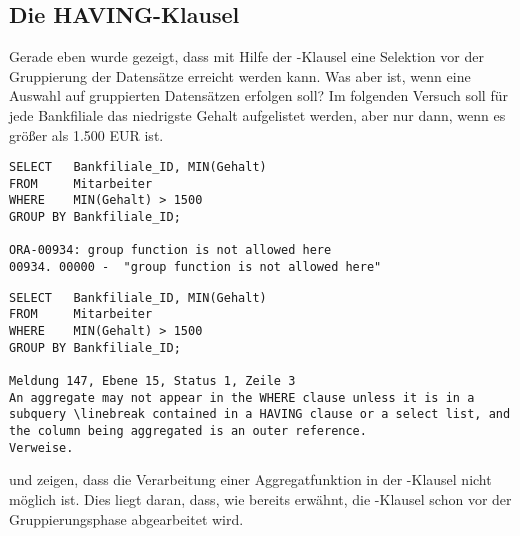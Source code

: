       \subsection{Die HAVING-Klausel}
        Gerade eben wurde gezeigt, dass mit Hilfe der \WHERE-Klausel eine Selektion vor der Gruppierung der Datensätze erreicht werden kann. Was aber ist, wenn eine Auswahl auf gruppierten Datensätzen erfolgen soll? Im folgenden Versuch soll für jede Bankfiliale das niedrigste Gehalt aufgelistet werden, aber nur dann, wenn es größer als 1.500 EUR ist.
        \begin{lstlisting}[language=oracle_sql,caption={Ein Versuch\dots mit Oracle},label=sql05_16]
SELECT   Bankfiliale_ID, MIN(Gehalt)
FROM     Mitarbeiter
WHERE    MIN(Gehalt) > 1500
GROUP BY Bankfiliale_ID;

ORA-00934: group function is not allowed here
00934. 00000 -  "group function is not allowed here"
        \end{lstlisting}
        \begin{lstlisting}[language=ms_sql,caption={Der gleiche Versuch\dots mit MS SQL Server},label=sql05_17]
SELECT   Bankfiliale_ID, MIN(Gehalt)
FROM     Mitarbeiter
WHERE    MIN(Gehalt) > 1500
GROUP BY Bankfiliale_ID;

Meldung 147, Ebene 15, Status 1, Zeile 3
An aggregate may not appear in the WHERE clause unless it is in a subquery \linebreak contained in a HAVING clause or a select list, and the column being aggregated is an outer reference.
Verweise.
        \end{lstlisting}
         und  zeigen, dass die Verarbeitung einer Aggregatfunktion in der \WHERE-Klausel nicht möglich ist. Dies liegt daran, dass, wie bereits erwähnt, die \WHERE-Klausel schon vor der Gruppierungsphase abgearbeitet wird.

